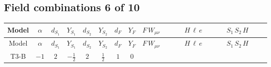 \documentclass[8pt]{article}
\begin{document}
\begin{landscape}
\subsection*{Field combinations 6 of 10}
\begin{longtable}{@{}cccccccc >{\raggedright\arraybackslash}p{0.21\linewidth} >{\raggedright\arraybackslash}p{0.21\linewidth} >{\raggedright\arraybackslash}p{0.21\linewidth}@{}}
\toprule
Model & $\alpha$ & $d_{S_1}$ & $Y_{S_1}$ & $d_{S_2}$ & $Y_{S_2}$ & $d_F$ & $Y_F$ & $F\,W_{\mu\nu}$ & $H\,\ell\,e$ & $S_1\,S_2\,H$ \\
\midrule
\endfirsthead
\toprule
Model & $\alpha$ & $d_{S_1}$ & $Y_{S_1}$ & $d_{S_2}$ & $Y_{S_2}$ & $d_F$ & $Y_F$ & $F\,W_{\mu\nu}$ & $H\,\ell\,e$ & $S_1\,S_2\,H$ \\
\midrule
\endhead
T3-B & $-1$ & $2$ & $-\frac{1}{2}$ & $2$ & $\frac{1}{2}$ & $1$ & $0$ &  & \scriptsize\adjustbox{max width=\linewidth}{$\begin{gathered} +\frac{\hbar  \overline{y_{1,i_3,r_1}} \overline{L_{a_1,i_2}}\, P_R\, e_{i_1} H_{a_1} y_{1,i_2,r_1} Y_{e,i_3,i_1}}{4 \epsilon } \\ +\frac{3}{8} \hbar  \overline{y_{1,i_3,r_1}} \overline{L_{a_1,i_2}}\, P_R\, e_{i_1} H_{a_1} y_{1,i_2,r_1} Y_{e,i_3,i_1} \\ +\frac{\hbar  \overline{y_{2,i_3,r_1}} \overline{L_{a_1,i_2}}\, P_R\, e_{i_1} H_{a_1} y_{2,i_2,r_1} Y_{e,i_3,i_1}}{4 \epsilon }\end{gathered}$} & \scriptsize\adjustbox{max width=\linewidth}{$\begin{gathered} -\frac{2 \hbar  \overline{y_{2,i_1,r_1}} \overline{Y_{e,i_2,i_3}} H_{a_2} S_{1,j_1} S_{2,j_2} y_{1,i_2,r_1} Y_{e,i_1,i_3} \mathcal{I}_{y_1,a_1,j_1} {\mathcal{I}_{y_2}}^{*}_{a_2,j_2} H_{a_1}{}^{\dagger }}{\epsilon } \\ -2 \hbar  \overline{y_{2,i_1,r_1}} \overline{Y_{e,i_2,i_3}} H_{a_2} S_{1,j_1} S_{2,j_2} y_{1,i_2,r_1} Y_{e,i_1,i_3} \mathcal{I}_{y_1,a_1,j_1} {\mathcal{I}_{y_2}}^{*}_{a_2,j_2} H_{a_1}{}^{\dagger } \\ +\overline{\lambda_5} S_{2,j_2} {\mathcal{I}_{T3}}^{*}_{a_1,a_2,j_1,j_2} H_{a_1}{}^{\dagger } H_{a_2}{}^{\dagger } S_{1,j_1}{}^{\dagger }\end{gathered}$} \\

\end{longtable}
\end{landscape}
\end{document}

